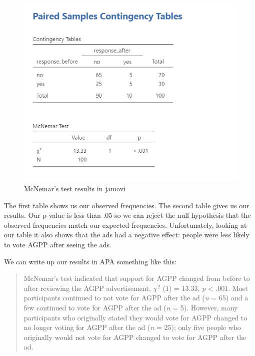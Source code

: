 \documentclass[
]{book}
\begin{document}
\begin{figure}

{\centering \includegraphics[width=1\linewidth]{images/12-mcnemar/mcnemar_results} 

}

\caption{McNemar's test results in jamovi}\label{fig:unnamed-chunk-3}
\end{figure}

The first table shows us our observed frequencies. The second table gives us our results. Our p-value is less than .05 so we can reject the null hypothesis that the observed frequencies match our expected frequencies. Unfortunately, looking at our table it also shows that the ads had a negative effect: people were less likely to vote AGPP after seeing the ads.

We can write up our results in APA something like this:

\begin{quote}
McNemar's test indicated that support for AGPP changed from before to after reviewing the AGPP advertisement, \(\chi^2\) (1) = 13.33, \emph{p} \textless{} .001. Most participants continued to not vote for AGPP after the ad (\emph{n} = 65) and a few continued to vote for AGPP after the ad (\emph{n} = 5). However, many participants who originally stated they would vote for AGPP changed to no longer voting for AGPP after the ad (\emph{n} = 25); only five people who originally would not vote for AGPP changed to vote for AGPP after the ad.
\end{quote}
\end{document}

